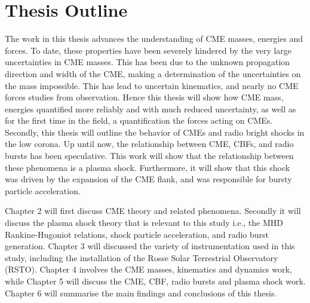 \clearpage





\section{Thesis Outline}

The work in this thesis advances the understanding of CME masses, energies and forces. To date, these properties have been severely hindered by the very large uncertainties in CME masses. This has been due to the unknown propagation direction and width of the CME, making a determination of the uncertainties on the mass impossible. This has lead to uncertain kinematics, and nearly no CME forces studies from observation. Hence this thesis will show how CME mass, energies quantified more reliably and with much reduced uncertainty, as well as for the first time in the field, a quantification the forces acting on CMEs. Secondly, this thesis will outline the behavior of CMEs and radio bright shocks in the low corona. Up until now, the relationship between CME, CBFs, and radio bursts has been speculative. This work will show that the relationship between these phenomena is a plasma shock. Furthermore, it will show that this shock was driven by the expansion of the CME flank, and was responsible for bursty particle acceleration.

Chapter 2 will first discuss CME theory and related phenomena. Secondly it will discuss the plasma shock theory that is relevant to this study i.e., the MHD Rankine-Hugoniot relations, shock particle acceleration, and radio burst generation. Chapter 3 will discussed the variety of instrumentation used in this study, including the installation of the Rosse Solar Terrestrial Observatory (RSTO). Chapter 4 involves the CME masses, kinematics and dynamics work, while Chapter 5 will discuss the CME, CBF, radio bursts and plasma shock work. Chapter 6 will summarise the main findings and conclusions of this thesis.
